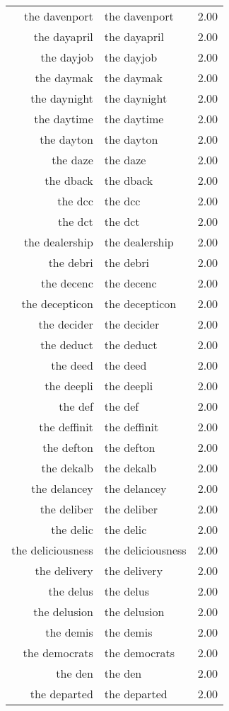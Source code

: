 \begin{table}[ht]
\begin{tabular}{rlr}
  the davenport & the davenport & 2.00 \\ 
  the dayapril & the dayapril & 2.00 \\ 
  the dayjob & the dayjob & 2.00 \\ 
  the daymak & the daymak & 2.00 \\ 
  the daynight & the daynight & 2.00 \\ 
  the daytime & the daytime & 2.00 \\ 
  the dayton & the dayton & 2.00 \\ 
  the daze & the daze & 2.00 \\ 
  the dback & the dback & 2.00 \\ 
  the dcc & the dcc & 2.00 \\ 
  the dct & the dct & 2.00 \\ 
  the dealership & the dealership & 2.00 \\ 
  the debri & the debri & 2.00 \\ 
  the decenc & the decenc & 2.00 \\ 
  the decepticon & the decepticon & 2.00 \\ 
  the decider & the decider & 2.00 \\ 
  the deduct & the deduct & 2.00 \\ 
  the deed & the deed & 2.00 \\ 
  the deepli & the deepli & 2.00 \\ 
  the def & the def & 2.00 \\ 
  the deffinit & the deffinit & 2.00 \\ 
  the defton & the defton & 2.00 \\ 
  the dekalb & the dekalb & 2.00 \\ 
  the delancey & the delancey & 2.00 \\ 
  the deliber & the deliber & 2.00 \\ 
  the delic & the delic & 2.00 \\ 
  the deliciousness & the deliciousness & 2.00 \\ 
  the delivery & the delivery & 2.00 \\ 
  the delus & the delus & 2.00 \\ 
  the delusion & the delusion & 2.00 \\ 
  the demis & the demis & 2.00 \\ 
  the democrats & the democrats & 2.00 \\ 
  the den & the den & 2.00 \\ 
  the departed & the departed & 2.00 \\ 

\end{tabular}
\end{table}
